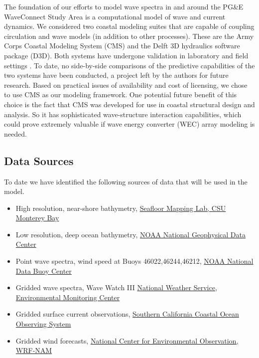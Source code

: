 \documentclass[11pt,letterpaper,oneside,reqno]{article}
\begin{document}
The foundation of our efforts to model wave spectra in and around
the PG\&E WaveConnect Study Area is a computational model of wave
and current dynamics. We considered two coastal modeling suites that
are capable of coupling circulation and wave models (in addition to
other processes). These are the Army Corps Coastal Modeling System
(CMS) and the Delft 3D hydraulics software package (D3D). Both
systems have undergone validation in laboratory and field settings
\citep{lin2008}\citep{gerritsen2008}. To date, no side-by-side comparisons of
the predictive capabilities of the two systems have been conducted,
a project left by the authors for future research. Based on
practical issues of availability and cost of licensing, we chose to
use CMS as our modeling framework. One potential future benefit of
this choice is the fact that CMS was developed for use in coastal
structural design and analysis. So it has sophisticated
wave-structure interaction capabilities, which could prove
extremely valuable if wave energy converter (WEC) array modeling is
needed.

\subsection{Data Sources}

To date we have identified the following sources of data that will
be used in the model.

\begin{itemize}
\item
  High resolution, near-shore bathymetry,
  \href{http://seafloor.csumb.edu/SFMLwebDATA_SURVEYMAP.htm}{Seafloor Mapping Lab, CSU Monterey Bay}
\item
  Low resolution, deep ocean bathymetry,
  \href{http://www.ngdc.noaa.gov/mgg/geodas/geodas.html}{NOAA National Geophysical Data Center}
\item
  Point wave spectra, wind speed at Buoys 46022,46244,46212,
  \href{http://www.ndbc.noaa.gov}{NOAA National Data Buoy Center}
\item
  Gridded wave spectra, Wave Watch III
  \href{http://polar.ncep.noaa.gov/waves/index2.shtml}{National Weather Service, Environmental Monitoring Center}
\item
  Gridded surface current observations,
  \href{http://www.sccoos.org/data/hfrnet/oi.php}{Southern California Coastal Ocean Observing System}
\item
  Gridded wind forecasts,
  \href{http://www.nco.ncep.noaa.gov/pmb/nwprod/analysis/}{National Center for Environmental Observation, WRF-NAM}
\end{itemize}
\end{document}
